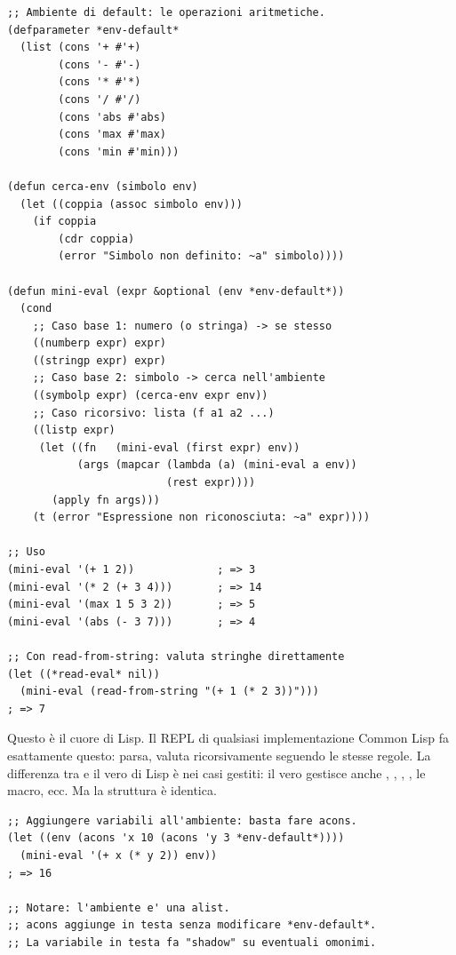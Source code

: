 \begin{esempio}
\begin{lstlisting}
;; Ambiente di default: le operazioni aritmetiche.
(defparameter *env-default*
  (list (cons '+ #'+)
        (cons '- #'-)
        (cons '* #'*)
        (cons '/ #'/)
        (cons 'abs #'abs)
        (cons 'max #'max)
        (cons 'min #'min)))

(defun cerca-env (simbolo env)
  (let ((coppia (assoc simbolo env)))
    (if coppia
        (cdr coppia)
        (error "Simbolo non definito: ~a" simbolo))))

(defun mini-eval (expr &optional (env *env-default*))
  (cond
    ;; Caso base 1: numero (o stringa) -> se stesso
    ((numberp expr) expr)
    ((stringp expr) expr)
    ;; Caso base 2: simbolo -> cerca nell'ambiente
    ((symbolp expr) (cerca-env expr env))
    ;; Caso ricorsivo: lista (f a1 a2 ...)
    ((listp expr)
     (let ((fn   (mini-eval (first expr) env))
           (args (mapcar (lambda (a) (mini-eval a env))
                         (rest expr))))
       (apply fn args)))
    (t (error "Espressione non riconosciuta: ~a" expr))))

;; Uso
(mini-eval '(+ 1 2))             ; => 3
(mini-eval '(* 2 (+ 3 4)))       ; => 14
(mini-eval '(max 1 5 3 2))       ; => 5
(mini-eval '(abs (- 3 7)))       ; => 4

;; Con read-from-string: valuta stringhe direttamente
(let ((*read-eval* nil))
  (mini-eval (read-from-string "(+ 1 (* 2 3))")))
; => 7
\end{lstlisting}
\end{esempio}

\begin{intuizione}
Questo è il cuore di Lisp.
Il REPL di qualsiasi implementazione Common Lisp
fa esattamente questo:  parsa,  valuta
ricorsivamente seguendo le stesse regole.
La differenza tra  e il vero  di Lisp
è nei casi gestiti: il vero  gestisce anche
, , , , le macro, ecc.
Ma la struttura è identica.
\end{intuizione}

\begin{esempio}
\begin{lstlisting}
;; Aggiungere variabili all'ambiente: basta fare acons.
(let ((env (acons 'x 10 (acons 'y 3 *env-default*))))
  (mini-eval '(+ x (* y 2)) env))
; => 16

;; Notare: l'ambiente e' una alist.
;; acons aggiunge in testa senza modificare *env-default*.
;; La variabile in testa fa "shadow" su eventuali omonimi.
\end{lstlisting}
\end{esempio}

